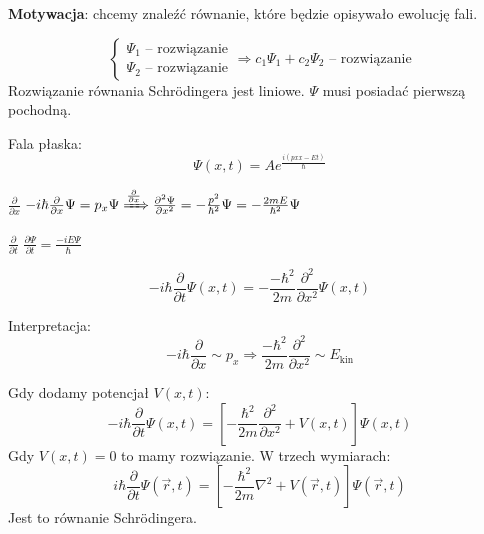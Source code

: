 \textbf{Motywacja}: chcemy znaleźć równanie, które będzie opisywało ewolucję fali.

\[
\begin{cases}
    \Psi_1 \text{ -- rozwiązanie} \\
    \Psi_2 \text{ -- rozwiązanie}
\end{cases} \Rightarrow c_1 \Psi_1 + c_2 \Psi_2 \text{ -- rozwiązanie}
\]
Rozwiązanie równania Schrödingera jest liniowe. $\Psi$ musi posiadać pierwszą pochodną.

Fala płaska:
\[
\Psi(x,t) = A e^{\frac{i(px x - Et)}{\hbar}}
\]

$\frac{\partial}{\partial x}$ $-i \hbar \frac{\partial}{\partial x} \Psi = p_x \Psi \xRightarrow{\frac{\partial}{\partial x}} \frac{\partial^2\Psi}{\partial x^2} = -\frac{p^2}{\hbar^2} \Psi = -\frac{2mE}{\hbar^2} \Psi$

$\frac{\partial}{\partial t}$ $\frac{\partial\Psi}{\partial t} = \frac{-iE\Psi}{\hbar}$

\[
-i\hbar \frac{\partial}{\partial t} \Psi(x, t) = -\frac{-\hbar^2}{2m} \frac{\partial^2}{\partial x^2} \Psi(x, t)
\]

Interpretacja:
\[
-i\hbar \frac{\partial}{\partial x} \sim p_x \Rightarrow \frac{-\hbar^2}{2m} \frac{\partial^2}{\partial x^2} \sim E_{\text{kin}}
\]

Gdy dodamy potencjał $V(x,t)$:
\[
-i\hbar \frac{\partial}{\partial t} \Psi(x,t) = \left[ -\frac{\hbar^2}{2m} \frac{\partial^2}{\partial x^2} + V(x,t) \right] \Psi(x,t)
\]
Gdy $V(x,t) = 0$ to mamy rozwiązanie.
W trzech wymiarach:
\[
i\hbar \frac{\partial}{\partial t} \Psi(\vec{r},t) = \left[ -\frac{\hbar^2}{2m} \nabla^2 + V(\vec{r},t) \right] \Psi(\vec{r},t)
\]
Jest to równanie Schrödingera.
